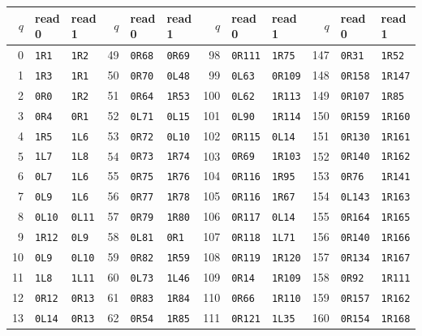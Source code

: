 \begin{center}\small
\setlength{\tabcolsep}{4.5pt}
\renewcommand{\arraystretch}{1.04}
\begin{tabular}{@{}rll@{\quad}rll@{\quad}rll@{\quad}rll@{}}
\toprule
$q$&read 0&read 1&$q$&read 0&read 1&$q$&read 0&read 1&$q$&read 0&read 1\\\midrule
0&\texttt{1R1}&\texttt{1R2}&49&\texttt{0R68}&\texttt{0R69}&98&\texttt{0R111}&\texttt{1R75}&147&\texttt{0R31}&\texttt{1R52}\\
1&\texttt{1R3}&\texttt{1R1}&50&\texttt{0R70}&\texttt{0L48}&99&\texttt{0L63}&\texttt{0R109}&148&\texttt{0R158}&\texttt{1R147}\\
2&\texttt{0R0}&\texttt{1R2}&51&\texttt{0R64}&\texttt{1R53}&100&\texttt{0L62}&\texttt{1R113}&149&\texttt{0R107}&\texttt{1R85}\\
3&\texttt{0R4}&\texttt{0R1}&52&\texttt{0L71}&\texttt{0L15}&101&\texttt{0L90}&\texttt{1R114}&150&\texttt{0R159}&\texttt{1R160}\\
4&\texttt{1R5}&\texttt{1L6}&53&\texttt{0R72}&\texttt{0L10}&102&\texttt{0R115}&\texttt{0L14}&151&\texttt{0R130}&\texttt{1R161}\\
5&\texttt{1L7}&\texttt{1L8}&54&\texttt{0R73}&\texttt{1R74}&103&\texttt{0R69}&\texttt{1R103}&152&\texttt{0R140}&\texttt{1R162}\\
6&\texttt{0L7}&\texttt{1L6}&55&\texttt{0R75}&\texttt{1R76}&104&\texttt{0R116}&\texttt{1R95}&153&\texttt{0R76}&\texttt{1R141}\\
7&\texttt{0L9}&\texttt{1L6}&56&\texttt{0R77}&\texttt{1R78}&105&\texttt{0R116}&\texttt{1R67}&154&\texttt{0L143}&\texttt{1R163}\\
8&\texttt{0L10}&\texttt{0L11}&57&\texttt{0R79}&\texttt{1R80}&106&\texttt{0R117}&\texttt{0L14}&155&\texttt{0R164}&\texttt{1R165}\\
9&\texttt{1R12}&\texttt{0L9}&58&\texttt{0L81}&\texttt{0R1}&107&\texttt{0R118}&\texttt{1L71}&156&\texttt{0R140}&\texttt{1R166}\\
10&\texttt{0L9}&\texttt{0L10}&59&\texttt{0R82}&\texttt{1R59}&108&\texttt{0R119}&\texttt{1R120}&157&\texttt{0R134}&\texttt{1R167}\\
11&\texttt{1L8}&\texttt{1L11}&60&\texttt{0L73}&\texttt{1L46}&109&\texttt{0R14}&\texttt{1R109}&158&\texttt{0R92}&\texttt{1R111}\\
12&\texttt{0R12}&\texttt{0R13}&61&\texttt{0R83}&\texttt{1R84}&110&\texttt{0R66}&\texttt{1R110}&159&\texttt{0R157}&\texttt{1R162}\\
13&\texttt{0L14}&\texttt{0R13}&62&\texttt{0R54}&\texttt{1R85}&111&\texttt{0R121}&\texttt{1L35}&160&\texttt{0R154}&\texttt{1R168}\\

\end{tabular}
\end{center}
